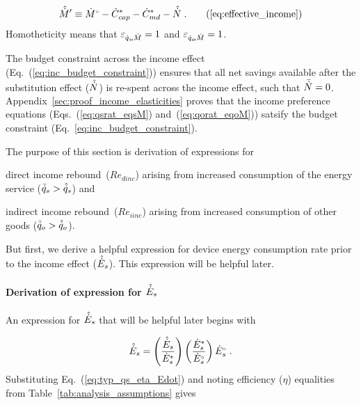 \begin{equation}
  \effinceqn{} \; . \tag{\ref{eq:effective_income}}
\end{equation}
%
Homotheticity means that $\varepsilon_{\dot{q}_s\!,\dot{M}} = 1$ and $\varepsilon_{\dot{q}_o\!,\dot{M}} = 1$.

The budget constraint across the income effect (Eq.~(\ref{eq:inc_budget_constraint})) 
ensures that all net savings available after the substitution effect ($\hat{\dot{N}}$) 
is re-spent across the income effect, 
such that $\bar{\dot{N}} = 0$.
Appendix~\ref{sec:proof_income_elasticities} proves that
the income preference equations (Eqs.~(\ref{eq:qsrat_eqsM}) and~(\ref{eq:qorat_eqoM})) 
satsify the budget constraint (Eq.~\ref{eq:inc_budget_constraint}).

The purpose of this section is derivation of expressions for 
%
\begin{enumerate*}[label={(\roman*)}]
	
  \item direct income rebound~($Re_{dinc}$) 
        arising from increased consumption of the energy service 
        ($\bar{\dot{q}}_s > \hat{\dot{q}}_s$) and
  
  \item indirect income rebound~($Re_{iinc}$) 
        arising from increased consumption of other goods 
        ($\bar{\dot{q}}_o > \hat{\dot{q}}_o$).
    
\end{enumerate*}

But first, we derive a helpful expression 
for device energy consumption rate prior to the income effect 
($\hat{\dot{E}}_s$).
This expression will be helpful later.

\paragraph{Derivation of expression for $\hat{\dot{E}}_s$}
\label{sec:E_dot_s_hat_expression}

An expression for $\hat{\dot{E}}_s$ that will be helpful later
begins with

\begin{equation}
  \hat{\dot{E}}_s = \left( \frac{\hat{\dot{E}}_s}{{\dot{E}}^*_s} \right)
                \left( \frac{{\dot{E}}^*_s}{{}{\dot{E}}^{\scriptscriptstyle \circ}_s} \right)
                {}{\dot{E}}^{\scriptscriptstyle \circ}_s \; .
\end{equation}
%
Substituting Eq.~(\ref{eq:typ_qs_eta_Edot}) and noting efficiency ($\eta$)
equalities from Table~\ref{tab:analysis_assumptions} gives

